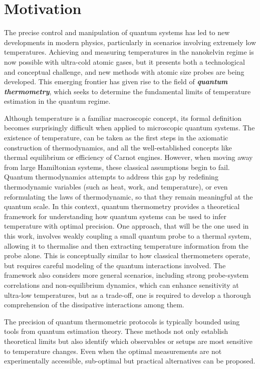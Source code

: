 \section{Motivation}
\hspace{0.5 cm}The precise control and manipulation of quantum systems has led to new developments in modern physics, particularly in scenarios involving extremely low temperatures. Achieving and measuring temperatures in the nanokelvin regime is now possible with ultra-cold atomic gases, but it presents both a technological and conceptual challenge, and new methods with atomic size probes are being developed. This emerging frontier has given rise to the field of \textit{\textbf{quantum thermometry}}, which seeks to determine the fundamental limits of temperature estimation in the quantum regime.\vspace{0.4 cm}

Although temperature is a familiar macroscopic concept, its formal definition becomes surprisingly difficult when applied to microscopic quantum systems. The existence of temperature, can be taken as the first steps in the axiomatic construction of thermodynamics, and all the well-established concepts like thermal equilibrium or efficiency of Carnot engines. However, when moving away from large Hamiltonian systems, these classical assumptions begin to fail. Quantum thermodynamics attempts to address this gap by redefining thermodynamic variables \cite{Binder2018}(such as heat, work, and temperature), or even reformulating the laws of thermodynamic, so that they remain meaningful at the quantum scale. In this context, quantum thermometry provides a theoretical framework for understanding how quantum systems can be used to infer temperature with optimal precision. One approach, that will be the one used in this work, involves weakly coupling a small quantum probe to a thermal system, allowing it to thermalise and then extracting temperature information from the probe alone. This is conceptually similar to how classical thermometers operate, but requires careful modeling of the quantum interactions involved. The framework also considers more general scenarios, including strong probe-system correlations and non-equilibrium dynamics, which can enhance sensitivity at ultra-low temperatures, but as a trade-off, one is required to develop a thorough comprehension of the dissipative interactions among them.\vspace{0.4 cm}

The precision of quantum thermometric protocols is typically bounded using tools from quantum estimation theory. These methods not only establish theoretical limits but also identify which observables or setups are most sensitive to temperature changes. Even when the optimal measurements are not experimentally accessible, sub-optimal but practical alternatives can be proposed.\vspace{0.4 cm}

